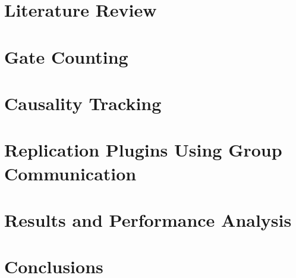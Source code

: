 \documentclass[11pt,a4paper,twoside]{book} %
\begin{document}
    \chapter{Literature Review}
        
		\mbox{}
	\chapter{Gate Counting}
		
		\mbox{}
	\chapter{Causality Tracking}
		\mbox{}
	\chapter{Replication Plugins Using Group Communication}
		\mbox{}
	\chapter{Results and Performance Analysis}
		\thispagestyle{plain}
		\mbox{}
   \chapter{Conclusions}
   	\newpage
   	\thispagestyle{plain}
   	\mbox{}

	
	
	\appendix
%			
			
%			
\end{document}
